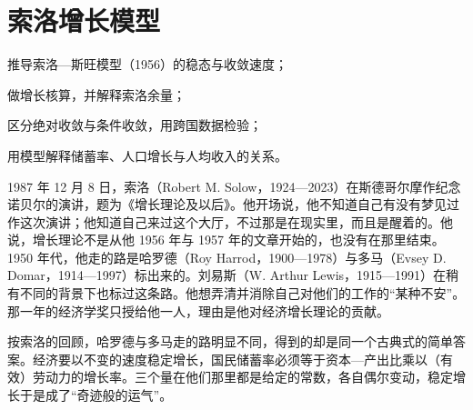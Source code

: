 \chapter{索洛增长模型}\label{ch:solow}

\begin{chapterguide}
\begin{guidegoals}
\item 推导索洛—斯旺模型（1956）的稳态与收敛速度；
\item 做增长核算，并解释索洛余量；
\item 区分绝对收敛与条件收敛，用跨国数据检验；
\item 用模型解释储蓄率、人口增长与人均收入的关系。
\end{guidegoals}
\end{chapterguide}

1987 年 12 月 8 日，索洛（Robert M. Solow，1924—2023）在斯德哥尔摩作纪念诺贝尔的演讲，题为《增长理论及以后》\cite{solow1987,loc40,gnd40}。他开场说，他不知道自己有没有梦见过作这次演讲；他知道自己来过这个大厅，不过那是在现实里，而且是醒着的\cite{solow1987}。他说，增长理论不是从他 1956 年与 1957 年的文章开始的，也没有在那里结束\cite{solow1987}。1950 年代，他走的路是哈罗德（Roy Harrod，1900—1978）与多马（Evsey D. Domar，1914—1997）标出来的\cite{solow1987,loc33,gnd34}。刘易斯（W. Arthur Lewis，1915—1991）在稍有不同的背景下也标过这条路\cite{solow1987,loc40,gnd40}。他想弄清并消除自己对他们的工作的“某种不安”\cite{solow1987}。那一年的经济学奖只授给他一人，理由是他对经济增长理论的贡献\cite{nobel1987}。

按索洛的回顾，哈罗德与多马走的路明显不同，得到的却是同一个古典式的简单答案\cite{solow1987}。经济要以不变的速度稳定增长，国民储蓄率必须等于资本—产出比乘以（有效）劳动力的增长率\cite{solow1987}。三个量在他们那里都是给定的常数，各自偶尔变动，稳定增长于是成了“奇迹般的运气”\cite{solow1987}。

